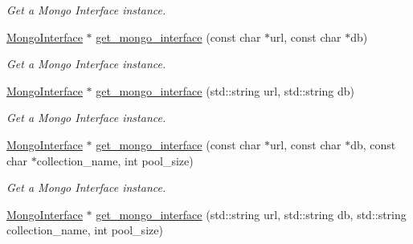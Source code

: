 \begin{DoxyCompactItemize}
\begin{DoxyCompactList}\small\item\em Get a Mongo Interface instance. \end{DoxyCompactList}\item 
\hyperlink{classMongoInterface}{Mongo\+Interface} $\ast$ \hyperlink{classMongoComponentFactory_ae76578bb9a27d48d826840dc3be913d4}{get\+\_\+mongo\+\_\+interface} (const char $\ast$url, const char $\ast$db)\hypertarget{classMongoComponentFactory_ae76578bb9a27d48d826840dc3be913d4}{}\label{classMongoComponentFactory_ae76578bb9a27d48d826840dc3be913d4}

\begin{DoxyCompactList}\small\item\em Get a Mongo Interface instance. \end{DoxyCompactList}\item 
\hyperlink{classMongoInterface}{Mongo\+Interface} $\ast$ \hyperlink{classMongoComponentFactory_addd2a8eabc1d264f911027e1bd64aac7}{get\+\_\+mongo\+\_\+interface} (std\+::string url, std\+::string db)\hypertarget{classMongoComponentFactory_addd2a8eabc1d264f911027e1bd64aac7}{}\label{classMongoComponentFactory_addd2a8eabc1d264f911027e1bd64aac7}

\begin{DoxyCompactList}\small\item\em Get a Mongo Interface instance. \end{DoxyCompactList}\item 
\hyperlink{classMongoInterface}{Mongo\+Interface} $\ast$ \hyperlink{classMongoComponentFactory_a5e4c960eda23c22134685640a3ced24c}{get\+\_\+mongo\+\_\+interface} (const char $\ast$url, const char $\ast$db, const char $\ast$collection\+\_\+name, int pool\+\_\+size)\hypertarget{classMongoComponentFactory_a5e4c960eda23c22134685640a3ced24c}{}\label{classMongoComponentFactory_a5e4c960eda23c22134685640a3ced24c}

\begin{DoxyCompactList}\small\item\em Get a Mongo Interface instance. \end{DoxyCompactList}\item 
\hyperlink{classMongoInterface}{Mongo\+Interface} $\ast$ \hyperlink{classMongoComponentFactory_ab2b7e0247e44b133dec4ab391d2b76de}{get\+\_\+mongo\+\_\+interface} (std\+::string url, std\+::string db, std\+::string collection\+\_\+name, int pool\+\_\+size)\hypertarget{classMongoComponentFactory_ab2b7e0247e44b133dec4ab391d2b76de}{}\label{classMongoComponentFactory_ab2b7e0247e44b133dec4ab391d2b76de}


\end{DoxyCompactItemize}
